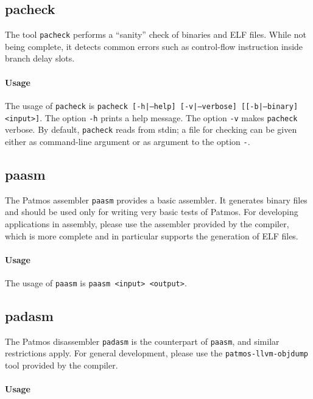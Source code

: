 \documentclass[a4paper,fontsize=10pt,twoside,DIV15,BCOR12mm,headinclude=true,footinclude=false,pagesize,bibtotoc]{scrbook}
\begin{document}
\subsection{pacheck}

The tool \texttt{pacheck} performs a ``sanity'' check of binaries and
ELF files. While not being complete, it detects common errors such as
control-flow instruction inside branch delay slots.

\paragraph{Usage}

The usage of \texttt{pacheck} is \texttt{pacheck [-h|---help]
  [-v|---verbose] [[-b|---binary] <input>]}. The option \texttt{-h}
prints a help message. The option \texttt{-v} makes \texttt{pacheck}
verbose. By default, \texttt{pacheck} reads from stdin; a file for
checking can be given either as command-line argument or as argument
to the option \texttt{-}.

\subsection{paasm}

The Patmos assembler \texttt{paasm} provides a basic assembler. It
generates binary files and should be used only for writing very basic
tests of Patmos. For developing applications in assembly, please use
the assembler provided by the compiler, which is more complete and in
particular supports the generation of ELF files.

\paragraph{Usage}

The usage of \texttt{paasm} is \texttt{paasm <input> <output>}.

\subsection{padasm}

The Patmos disassembler \texttt{padasm} is the counterpart of
\texttt{paasm}, and similar restrictions apply. For general
development, please use the \texttt{patmos-llvm-objdump} tool provided
by the compiler.

\paragraph{Usage}
\end{document}
